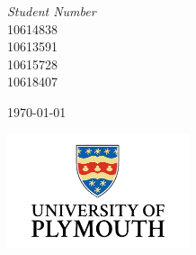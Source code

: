 \documentclass [12pt]{article}
\begin{document}
\begin{titlepage}
	{\large\textit{Student Number}}\\
	10614838 \\%
	10613591 \\%
	10615728 \\%
	10618407 %
	
	
	
	\vfill\vfill\vfill %
	
	{\large\today} %
	
	
	\vfill\vfill
	\includegraphics[width=0.4\textwidth]{UOP_Logo.png}\\[1cm] %
	 
	
	\vfill %
	
\end{titlepage}


\newpage
{}
\tableofcontents
\listoffigures
\listoftables
\printglossaries


\end{document}
